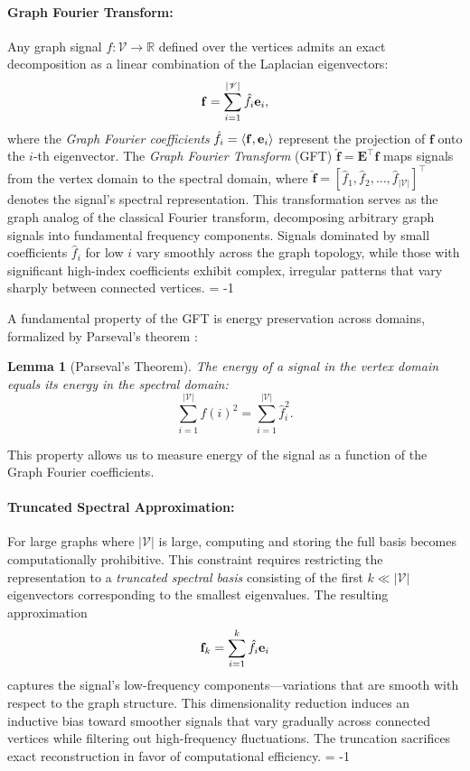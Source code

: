 \documentclass{article}
\theoremstyle{plain}
\newtheorem{lemma}[theorem]{Lemma}
\theoremstyle{definition}
\theoremstyle{remark}
\begin{document}
\paragraph{Graph Fourier Transform:} 
Any graph signal $f: \mathscr{V} \rightarrow \mathbb{R}$ defined over the vertices admits an exact decomposition as a linear combination of the Laplacian eigenvectors:
\begin{equation}
\mathbf{f} = \sum_{i=1}^{|\mathscr{V}|} \hat{f}_i \mathbf{e}_i,
\end{equation}
where the \textit{Graph Fourier coefficients} $\hat{f}_i = \langle \mathbf{f}, \mathbf{e}_i \rangle$ represent the projection of $\mathbf{f}$ onto the $i$-th eigenvector. The \textit{Graph Fourier Transform} (GFT) $\mathbf{\hat{f}} = \mathbf{E}^\top \mathbf{f}$ maps signals from the vertex domain to the spectral domain, where $\mathbf{\hat{f}} = [\hat{f}_1, \hat{f}_2, \dots, \hat{f}_{|\mathscr{V}|}]^\top$ denotes the signal's spectral representation. This transformation serves as the graph analog of the classical Fourier transform, decomposing arbitrary graph signals into fundamental frequency components. Signals dominated by small coefficients $\hat{f}_i$ for low $i$ vary smoothly across the graph topology, while those with significant high-index coefficients exhibit complex, irregular patterns that vary sharply between connected vertices. \looseness = -1

A fundamental property of the GFT is energy preservation across domains, formalized by Parseval's theorem \cite{shuman2016vertex}:

\begin{lemma}[Parseval's Theorem]
The energy of a signal in the vertex domain equals its energy in the spectral domain:
\begin{equation}
\sum_{i=1}^{|\mathscr{V}|} f(i)^2 = \sum_{i=1}^{|\mathscr{V}|} \hat{f}_i^2.
\end{equation}
\label{lm:parseval}
\end{lemma}

This property allows us to measure energy of the signal as a function of the Graph Fourier coefficients.

\paragraph{Truncated Spectral Approximation:} 
For large graphs where $|\mathscr{V}|$ is large, computing and storing the full basis becomes computationally prohibitive. This constraint requires restricting the representation to a \textit{truncated spectral basis} consisting of the first $k \ll |\mathscr{V}|$ eigenvectors corresponding to the smallest eigenvalues. The resulting approximation
\begin{equation}
\mathbf{f}_k = \sum_{i=1}^{k} \hat{f}_i \mathbf{e}_i
\end{equation}
captures the signal's low-frequency components---variations that are smooth with respect to the graph structure. This dimensionality reduction induces an inductive bias toward smoother signals that vary gradually across connected vertices while filtering out high-frequency fluctuations. The truncation sacrifices exact reconstruction in favor of computational efficiency. \looseness = -1
\end{document}
